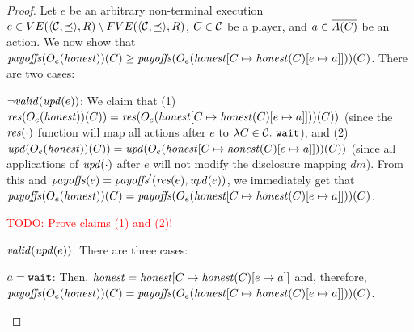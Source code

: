 \begin{proof}
Let $e$ be an arbitrary non-terminal execution $e \in VE(\tup{\coalitionSchema,\preceq},\rounds) \setminus FVE(\tup{\coalitionSchema,\preceq},\rounds)$, $C \in \coalitionSchema$ be a player, and $a \in \coalitionActions{C}$ be an action.
%
We now show that $\payoffs(\subgameOutcome{\honest}{e})(C) \geq \payoffs(\subgameOutcome{\honest[C \mapsto \honest(C)[e \mapsto a]]}{e})(C)$.
%
There are two cases:
\begin{compactitem}
\item[$\neg \valid{\update{e}}$: ]
%
We claim that (1) $\conflict{\subgameOutcome{\honest}{e})(C)} = \conflict{\subgameOutcome{\honest[C \mapsto \honest(C)[e \mapsto a]]}{e})(C)}$ (since the $\conflict{\cdot}$ function will map all actions after $e$ to $\lambda C \in \coalitionSchema.\ \wait$), and (2) $\update{\subgameOutcome{\honest}{e})(C)} = \update{\subgameOutcome{\honest[C \mapsto \honest(C)[e \mapsto a]]}{e})(C)}$ (since all applications of $\update{\cdot}$ after $e$ will not modify the disclosure mapping $dm$).
%
From this and $\payoffs(e) = \payoffs'(\conflict{e}, \update{e})$, we immediately get that $\payoffs(\subgameOutcome{\honest}{e})(C) = \payoffs(\subgameOutcome{\honest[C \mapsto \honest(C)[e \mapsto a]]}{e})(C)$.

\textcolor{red}{TODO: Prove claims (1) and (2)!}

\item[$\valid{\update{e}}$: ]
%
There are three cases:
\begin{compactitem}
\item[$a = \wait$:]
%
Then, $\honest = \honest[C \mapsto \honest(C)[e \mapsto a]]$ and, therefore, $\payoffs(\subgameOutcome{\honest}{e})(C) = \payoffs(\subgameOutcome{\honest[C \mapsto \honest(C)[e \mapsto a]]}{e})(C)$.


\end{compactitem}
\end{compactitem}
\end{proof}
